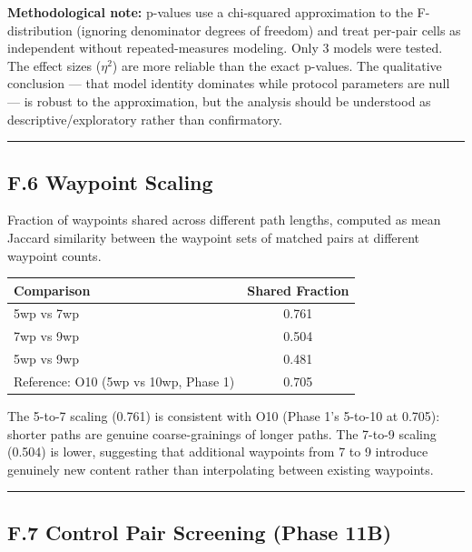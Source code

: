 \textbf{Methodological note:} p-values use a chi-squared approximation to the F-distribution (ignoring denominator degrees of freedom) and treat per-pair cells as independent without repeated-measures modeling. Only 3 models were tested. The effect sizes (\(\eta^2\)) are more reliable than the exact p-values. The qualitative conclusion --- that model identity dominates while protocol parameters are null --- is robust to the approximation, but the analysis should be understood as descriptive/exploratory rather than confirmatory.

\begin{center}\rule{0.5\linewidth}{0.5pt}\end{center}

\subsection{F.6 Waypoint Scaling}\label{f.6-waypoint-scaling}

Fraction of waypoints shared across different path lengths, computed as mean Jaccard similarity between the waypoint sets of matched pairs at different waypoint counts.

\begin{longtable}[]{@{}lc@{}}
\toprule\noalign{}
Comparison & Shared Fraction \\
\midrule\noalign{}
\endhead
\bottomrule\noalign{}
\endlastfoot
5wp vs 7wp & 0.761 \\
7wp vs 9wp & 0.504 \\
5wp vs 9wp & 0.481 \\
Reference: O10 (5wp vs 10wp, Phase 1) & 0.705 \\
\end{longtable}

The 5-to-7 scaling (0.761) is consistent with O10 (Phase 1's 5-to-10 at 0.705): shorter paths are genuine coarse-grainings of longer paths. The 7-to-9 scaling (0.504) is lower, suggesting that additional waypoints from 7 to 9 introduce genuinely new content rather than interpolating between existing waypoints.

\begin{center}\rule{0.5\linewidth}{0.5pt}\end{center}

\subsection{F.7 Control Pair Screening (Phase 11B)}\label{f.7-control-pair-screening-phase-11b}

